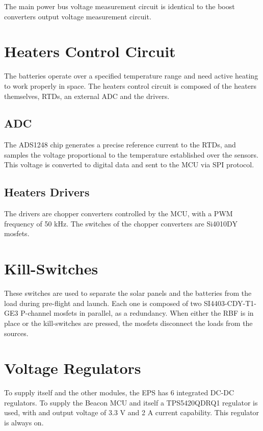 The main power bus voltage measurement circuit is identical to the boost converters output voltage measurement circuit.

\section{Heaters Control Circuit}

The batteries operate over a specified temperature range and need active heating to work properly in space. The heaters control circuit is composed of the heaters themselves, RTDs, an external ADC and the drivers.

\subsection{ADC}

The ADS1248 chip generates a precise reference current to the RTDs, and samples the voltage proportional to the temperature established over the sensors. This voltage is converted to digital data and sent to the MCU via SPI protocol.

\subsection{Heaters Drivers}

The drivers are chopper converters controlled by the MCU, with a PWM frequency of 50 kHz. The switches of the chopper converters are Si4010DY mosfets.

\section{Kill-Switches}

These switches are used to separate the solar panels and the batteries from the load during pre-flight and launch. Each one is composed of two SI4403-CDY-T1-GE3 P-channel mosfets in parallel, as a redundancy. When either the RBF is in place or the kill-switches are pressed, the mosfets disconnect the loads from the sources.

\section{Voltage Regulators}

To supply itself and the other modules, the EPS has 6 integrated DC-DC regulators. To supply the Beacon MCU and itself a TPS5420QDRQ1 regulator is used, with and output voltage of 3.3 V and 2 A current capability. This regulator is always on.

